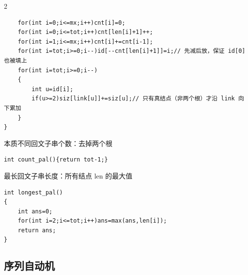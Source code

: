 \documentclass[UTF8,fontset=fandol,a4paper,twoside]{ctexart}
\newcommand{\note}[1]{{\fontsize{10}{12}\selectfont #1\par}}
\begin{document}
\begin{multicols}{2}
\begin{lstlisting}
    for(int i=0;i<=mx;i++)cnt[i]=0;
    for(int i=0;i<=tot;i++)cnt[len[i]+1]++;
    for(int i=1;i<=mx;i++)cnt[i]+=cnt[i-1];
    for(int i=tot;i>=0;i--)id[--cnt[len[i]+1]]=i;// 先减后放，保证 id[0] 也被填上
    for(int i=tot;i>=0;i--)
    {
        int u=id[i];
        if(u>=2)siz[link[u]]+=siz[u];// 只有真结点（非两个根）才沿 link 向下累加
    }
}
\end{lstlisting}
\note{本质不同回文子串个数：去掉两个根}
\begin{lstlisting}
int count_pal(){return tot-1;}
\end{lstlisting}
\note{最长回文子串长度：所有结点 len 的最大值}
\begin{lstlisting}
int longest_pal()
{
    int ans=0;
    for(int i=2;i<=tot;i++)ans=max(ans,len[i]);
    return ans;
}
\end{lstlisting}
\subsection{序列自动机}


\end{multicols}
\end{document}
